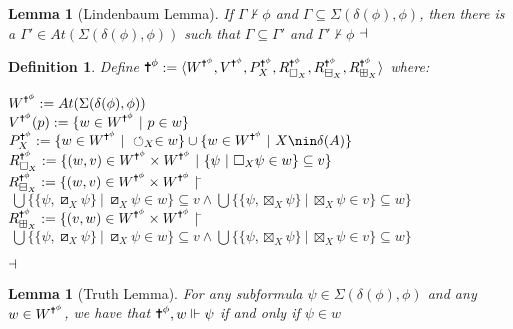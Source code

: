 \documentclass[11pt]{article}
\numberwithin{equation}{subsection}
\newtheorem{mydef}[theorem]{Definition}
\newtheorem{lemma}[theorem]{Lemma}
\newcommand{\ra}{\rangle}
\renewcommand{\Cross}{\textrm{\ding{61}}}
\newcommand{\Nec}{\Box}
\newcommand{\BB}{\boxminus}
\newcommand{\pBB}{\boxslash}
\newcommand{\BBI}{\boxplus}
\newcommand{\pBBI}{\boxtimes}
\newcommand{\PP}{\circlearrowleft}
\begin{document}
\begin{lemma}[Lindenbaum Lemma]If $\Gamma \nvdash \phi$ and $\Gamma\subseteq \Sigma(\delta(\phi),\phi)$, then there is a $\Gamma' \in At(\Sigma(\delta(\phi),\phi))$ such that $\Gamma \subseteq \Gamma'$ and $\Gamma' \nvdash \phi$
$\hfill\dashv$\end{lemma}
\begin{mydef}Define $\Cross^\phi := \langle W^{\Cross^\phi}, V^{\Cross^\phi}, P^{\Cross^\phi}_X, R^{\Cross^\phi}_{\Nec_X}, R^{\Cross^\phi}_{\BB_X}, R^{\Cross^\phi}_{\BBI_X}\ra$ where:
\begin{tabbing}
$W^{\Cross^\phi} := At(\Sigma(\delta(\phi),\phi))$ \\
$V^{\Cross^\phi}(p) := \{ w \in W^{\Cross^\phi}\ |\ p \in w \}$ \\
$P^{\Cross^\phi}_X := \{ w \in W^{\Cross^\phi}\ |\ \PP_X \in w \} \cup \{ w\in W^{\Cross^\phi} \ | \ X \nin \delta(A)\}$ \\
$R^{\Cross^\phi}_{\Nec_X} := \{(w,v) \in W^{\Cross^\phi} \times W^{\Cross^\phi}\ |\ \{ \psi\ |\ \Box_X \psi \in w\} \subseteq v \}$\\
$R^{\Cross^\phi}_{\BB_X} := \{(w,v) \in W^{\Cross^\phi} \times W^{\Cross^\phi}\ |$\=$\ \bigcup \{ \{\psi,\pBB_X \psi\}\ |\ \pBB_X \psi \in w\} \subseteq v \wedge \bigcup\{ \{\psi,\pBBI_X \psi\} \ |\ \pBBI_X \psi \in v\} \subseteq w \}$ \\
$R^{\Cross^\phi}_{\BBI_X} := \{(v,w) \in W^{\Cross^\phi} \times W^{\Cross^\phi}\ |$\=$\ \bigcup \{ \{\psi,\pBB_X \psi\}\ |\ \pBB_X \psi \in w\} \subseteq v \wedge \bigcup\{ \{\psi,\pBBI_X \psi\} \ |\ \pBBI_X \psi \in v\} \subseteq w \}$
\end{tabbing}
$\hfill\dashv$\end{mydef}
\begin{lemma}[Truth Lemma]\label{truth}
For any subformula $\psi \in \Sigma(\delta(\phi),\phi)$ and any $w \in W^{\Cross^\phi}$, we have that $\Cross^\phi, w \Vdash \psi$ if and only if $\psi \in w$
\end{lemma}
\end{document}
